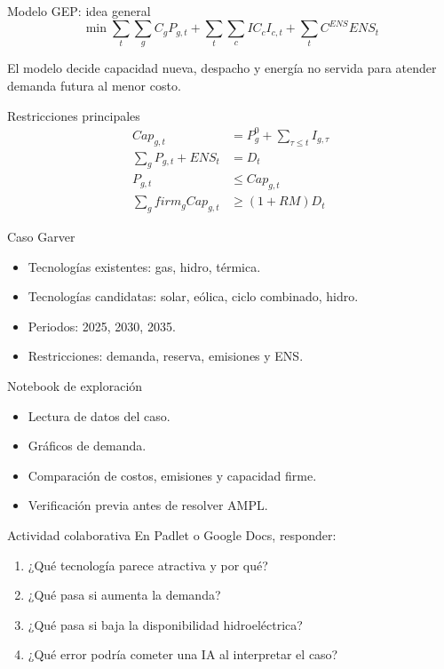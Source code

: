 \documentclass[aspectratio=169]{beamer}
\begin{document}
\begin{frame}{Modelo GEP: idea general}
  \begin{equation*}
  \min \sum_t\sum_g C_g P_{g,t} + \sum_t\sum_c IC_c I_{c,t} + \sum_t C^{ENS} ENS_t
  \end{equation*}

  El modelo decide capacidad nueva, despacho y energía no servida para atender demanda futura al menor costo.
\end{frame}

\begin{frame}{Restricciones principales}
  \begin{align*}
  Cap_{g,t} &= P_g^0 + \sum_{\tau\leq t} I_{g,\tau} \\
  \sum_g P_{g,t}+ENS_t &= D_t \\
  P_{g,t} &\leq Cap_{g,t} \\
  \sum_g firm_g Cap_{g,t} &\geq (1+RM)D_t
  \end{align*}
\end{frame}

\begin{frame}{Caso Garver}
  \begin{itemize}
    \item Tecnologías existentes: gas, hidro, térmica.
    \item Tecnologías candidatas: solar, eólica, ciclo combinado, hidro.
    \item Periodos: 2025, 2030, 2035.
    \item Restricciones: demanda, reserva, emisiones y ENS.
  \end{itemize}
\end{frame}

\begin{frame}{Notebook de exploración}
  \begin{itemize}
    \item Lectura de datos del caso.
    \item Gráficos de demanda.
    \item Comparación de costos, emisiones y capacidad firme.
    \item Verificación previa antes de resolver AMPL.
  \end{itemize}
\end{frame}

\begin{frame}{Actividad colaborativa}
  En Padlet o Google Docs, responder:
  \begin{enumerate}
    \item ¿Qué tecnología parece atractiva y por qué?
    \item ¿Qué pasa si aumenta la demanda?
    \item ¿Qué pasa si baja la disponibilidad hidroeléctrica?
    \item ¿Qué error podría cometer una IA al interpretar el caso?
  \end{enumerate}
\end{frame}
\end{document}
